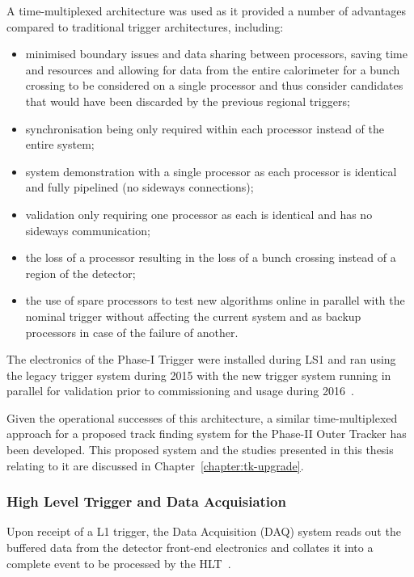 A time-multiplexed architecture was used as it provided a number of advantages compared to traditional trigger architectures, including:
\begin{itemize}
\item minimised boundary issues and data sharing between processors, saving time and resources and allowing for data from the entire calorimeter for a bunch crossing to be considered on a single processor and thus consider candidates that would have been discarded by the previous regional triggers;
\item synchronisation being only required within each processor instead of the entire system;
\item system demonstration with a single processor as each processor is identical and fully pipelined (no sideways connections);
\item validation only requiring one processor as each is identical and has no sideways communication;
\item the loss of a processor resulting in the loss of a bunch crossing instead of a region of the detector;
\item the use of spare processors to test new algorithms online in parallel with the nominal trigger without affecting the current system and as backup processors in case of the failure of another.
\end{itemize} 

The electronics of the Phase-I Trigger were installed during LS1 and ran using the legacy trigger system during 2015 with the new trigger system running in parallel for validation prior to commissioning and usage during 2016~\cite{Zabi:2017lya}.

Given the operational successes of this architecture, a similar time-multiplexed approach for a proposed track finding system for the Phase-II Outer Tracker has been developed.
This proposed system and the studies presented in this thesis relating to it are discussed in Chapter~\ref{chapter:tk-upgrade}.

\subsubsection{High Level Trigger and Data Acquisiation}\label{paragraph:HLT}
Upon receipt of a L1 trigger, the Data Acquisition (DAQ) system reads out the buffered data from the detector front-end electronics and collates it into a complete event to be processed by the HLT~\cite{Sphicas:2002gg}.


